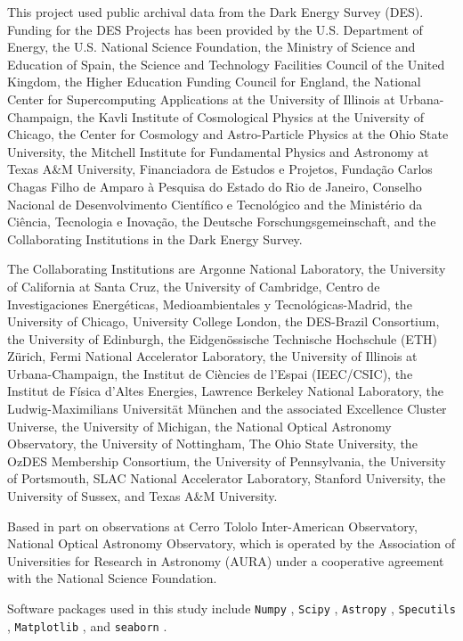 \documentclass[fleqn,usenatbib]{mnras}
\begin{document}
This project used public archival data from the Dark Energy Survey (DES). Funding for the DES Projects has been provided by the U.S. Department of Energy, the U.S. National Science Foundation, the Ministry of Science and Education of Spain, the Science and Technology Facilities Council of the United Kingdom, the Higher Education Funding Council for England, the National Center for Supercomputing Applications at the University of Illinois at Urbana-Champaign, the Kavli Institute of Cosmological Physics at the University of Chicago, the Center for Cosmology and Astro-Particle Physics at the Ohio State University, the Mitchell Institute for Fundamental Physics and Astronomy at Texas A\&M University, Financiadora de Estudos e Projetos, Funda{\c c}{\~a}o Carlos Chagas Filho de Amparo {\`a} Pesquisa do Estado do Rio de Janeiro, Conselho Nacional de Desenvolvimento Cient{\'i}fico e Tecnol{\'o}gico and the Minist{\'e}rio da Ci{\^e}ncia, Tecnologia e Inova{\c c}{\~a}o, the Deutsche Forschungsgemeinschaft, and the Collaborating Institutions in the Dark Energy Survey.

The Collaborating Institutions are Argonne National Laboratory, the University of California at Santa Cruz, the University of Cambridge, Centro de Investigaciones Energ{\'e}ticas, Medioambientales y Tecnol{\'o}gicas-Madrid, the University of Chicago, University College London, the DES-Brazil Consortium, the University of Edinburgh, the Eidgen{\"o}ssische Technische Hochschule (ETH) Z{\"u}rich,  Fermi National Accelerator Laboratory, the University of Illinois at Urbana-Champaign, the Institut de Ci{\`e}ncies de l'Espai (IEEC/CSIC), the Institut de F{\'i}sica d'Altes Energies, Lawrence Berkeley National Laboratory, the Ludwig-Maximilians Universit{\"a}t M{\"u}nchen and the associated Excellence Cluster Universe, the University of Michigan, the National Optical Astronomy Observatory, the University of Nottingham, The Ohio State University, the OzDES Membership Consortium, the University of Pennsylvania, the University of Portsmouth, SLAC National Accelerator Laboratory, Stanford University, the University of Sussex, and Texas A\&M University.

Based in part on observations at Cerro Tololo Inter-American Observatory, National Optical Astronomy Observatory, which is operated by the Association of Universities for Research in Astronomy (AURA) under a cooperative agreement with the National Science Foundation.

Software packages used in this study include \texttt{Numpy} \citep{Numpy_2011}, \texttt{Scipy} \citep{Scipy_2020}, \texttt{Astropy} \citep{Astropy_2013}, \texttt{Specutils} \citep{specutils_2022}, \texttt{Matplotlib} \citep{Matplotlib_2007}, and \texttt{seaborn} \citep{Waskom2021_seaborn}.
\end{document}
